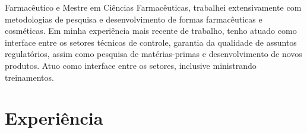 
\begin{center}
    \small 
        Farmacêutico e Mestre em Ciências Farmacêuticas, trabalhei extensivamente com metodologias de pesquisa e
        desenvolvimento de formas farmacêuticas e cosméticas.
        Em minha experiência mais recente de trabalho, tenho atuado como interface entre os setores técnicos
        de controle, garantia da qualidade de assuntos regulatórios, assim como pesquisa de matérias-primas e
        desenvolvimento de novos produtos.
        Atuo como interface entre os setores, inclusive ministrando treinamentos.

\end{center}
    



\section{Experiência}



